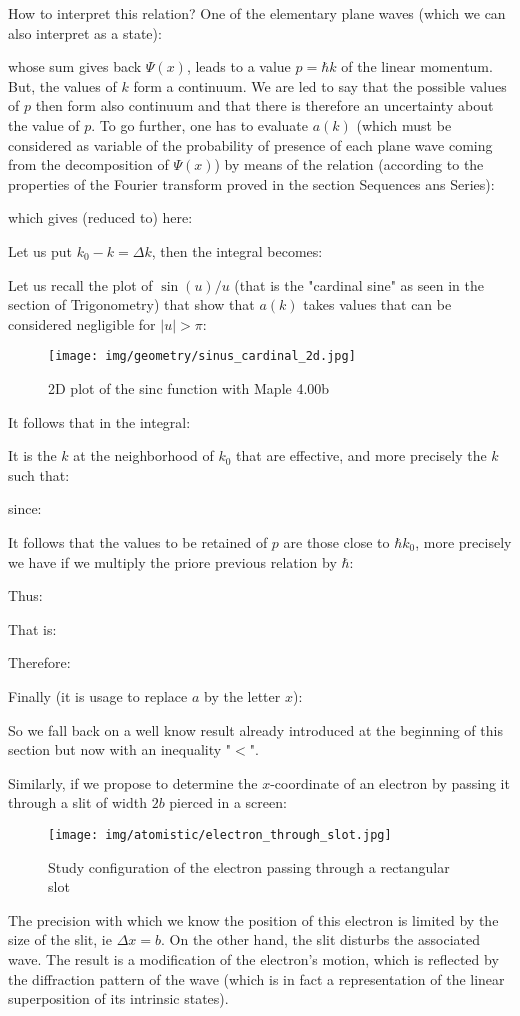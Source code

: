 	How to interpret this relation? One of the elementary plane waves (which we can also interpret as a state):
	
	whose sum gives back $\Psi(x)$, leads to a value $p=\hbar k$ of the linear momentum. But, the values of $k$ form a continuum. We are led to say that the possible values of $p$ then form also continuum and that there is therefore an uncertainty about the value of $p$. To go further, one has to evaluate $a(k)$ (which must be considered as variable of the probability of presence of each plane wave coming from the decomposition of $\Psi(x)$) by means of the relation (according to the properties of the Fourier transform proved in the section Sequences ans Series):
	
	which gives (reduced to) here:
	
	Let us put $k_0-k=\Delta k$, then the integral becomes:
	
	Let us recall the plot of $\sin(u)/u$ (that is the "cardinal sine" as seen in the section of Trigonometry) that show that $a(k)$ takes values that can be considered negligible for $|u|>\pi$:
	\begin{figure}[H]
		\centering
		\texttt{[image: img/geometry/sinus\_cardinal\_2d.jpg]}
		\caption{2D plot of the sinc function with Maple 4.00b}
	\end{figure}
	It follows that in the integral:
	
	It is the $k$ at the neighborhood of $k_0$ that are effective, and more precisely the $k$ such that:
	
	since:
	
	It follows that the values to be retained of $p$ are those close to $\hbar k_0$, more precisely we have if we multiply the priore previous relation by $\hbar$:
	
	Thus:
	
	That is:
	
	Therefore:
	
	Finally (it is usage to replace $a$ by the letter $x$):
	
	So we fall back on a well know result already introduced at the beginning of this section but now with an inequality "$<$".
	
	Similarly, if we propose to determine the $x$-coordinate of an electron by passing it through a slit of width $2b$ pierced in a screen:
	\begin{figure}[H]
		\centering
		\texttt{[image: img/atomistic/electron\_through\_slot.jpg]}
		\caption[]{Study configuration of the electron passing through a rectangular slot}
	\end{figure}
	The precision with which we know the position of this electron is limited by the size of the slit, ie $\Delta x=b$. On the other hand, the slit disturbs the associated wave. The result is a modification of the electron's motion, which is reflected by the diffraction pattern of the wave (which is in fact a representation of the linear superposition of its intrinsic states).

